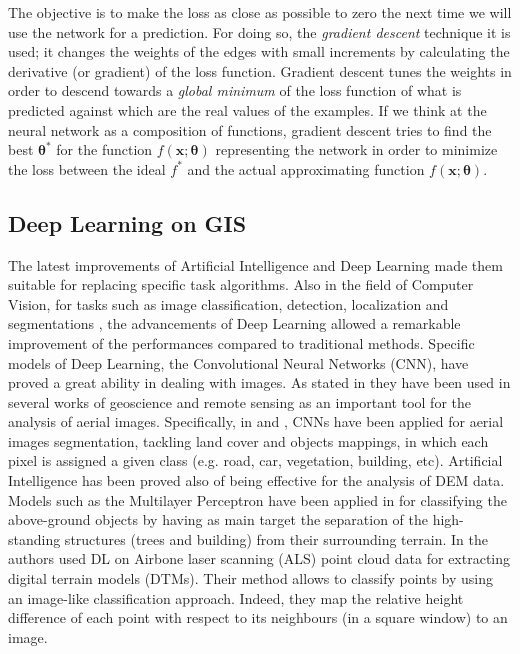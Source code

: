 The objective is to make the loss as close as possible to zero the next time we will use the network for a prediction. For doing so, the \textit{gradient descent} technique it is used; it changes the weights of the edges with small increments by calculating the derivative (or gradient) of the loss function. Gradient descent tunes the weights in order to descend towards a \textit{global minimum} of the loss function of what is predicted against which are the real values of the examples. If we think at the neural network as a composition of functions, gradient descent tries to find the best \(\boldsymbol{\theta}^*\) for the function \(f(\textbf{x};\boldsymbol{\theta}) \) representing the network in order to minimize the loss between the ideal \(f^*\) and the actual approximating function \(f(\textbf{x};\boldsymbol{\theta})\).

\subsection{Deep Learning on GIS}
The latest improvements of Artificial Intelligence and Deep Learning made them suitable for replacing specific task algorithms. Also in the field of Computer Vision, for tasks such as image classification, detection, localization and segmentations \cite{guo2016deep}, the advancements of Deep Learning allowed a remarkable improvement of the performances compared to traditional methods. 
Specific models of Deep Learning, the Convolutional Neural Networks (CNN), have proved a great ability in dealing with images. As stated in \cite{long2015fully} they have been used in several works of geoscience and remote sensing as an important tool for the analysis of aerial images. Specifically, in \cite{audebert2016semantic} and \cite{marmanis2016semantic}, CNNs have been applied for aerial images segmentation, tackling land cover and objects mappings, in which each pixel is assigned a given class (e.g. road, car, vegetation, building, etc). Artificial Intelligence has been proved also of being effective for the analysis of DEM data. Models such as the Multilayer Perceptron have been applied in \cite{marmanis2015deep} for classifying the above-ground objects by having as main target the separation of the high-standing structures (trees and building) from their surrounding terrain.
In \cite{chen2016convolutional} the authors used DL on Airbone laser scanning (ALS) point cloud data for extracting digital terrain models (DTMs). Their method allows to classify points by using an image-like classification approach. Indeed, they map the relative height difference of each point with respect to its neighbours (in a square window) to an image. 

